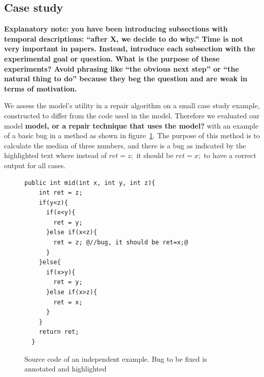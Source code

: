 \documentclass[conference]{IEEEtran}
\newcommand{\todo}[1]
  {{\scriptsize \textbf{\color{red} {#1}}}}
\begin{document}
\subsection{Case study}
\label{sec:casestudy}

\todo{Explanatory note: you have been introducing subsections with temporal
  descriptions: ``after X, we decide to do why.''  Time is not very important in
  papers.  Instead, introduce each subsection with the experimental goal or
  question.  What is the purpose of these experiments?  Avoid phrasing like
  ``the obvious next step'' or ``the natural thing to do'' because they beg the
  question and are weak in terms of motivation.}

We assess the
model's utility in a repair algorithm on a small case study example, constructed
to differ from the code used in the model.  Therefore we evaluated our model
\todo{model, or a repair technique that uses the model?}
with an example of a basic bug in a method as shown in figure~\ref{fig:initialExample}. The purpose of this method is to calculate the median 
of three numbers, and there is a bug as indicated by the highlighted text where 
instead of $ret = z;$ it should be $ret = x;$ to have a correct output 
for all cases.


\begin{figure}[t]
\begin{lstlisting}[frame=single,style=base]
  public int mid(int x, int y, int z){
    int ret = z;  
    if(y<z){
      if(x<y){
        ret = y;
      }else if(x<z){
        ret = z; @//bug, it should be ret=x;@
      }
    }else{
      if(x>y){
        ret = y;
      }else if(x>z){
        ret = x;
      }
    }
    return ret;
  }	
	\end{lstlisting}
	\caption{Source code of an independent example. Bug to be fixed is annotated and highlighted}
	\label{fig:initialExample}
\end{figure}



\end{document}
